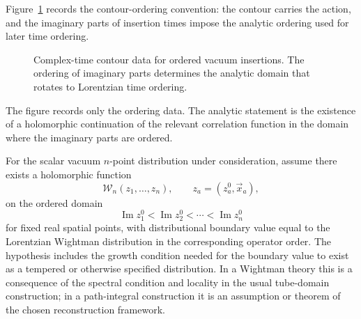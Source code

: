 Figure~\ref{fig:complex-time-contour-ordering} records the contour-ordering
convention: the contour carries the action, and the imaginary parts of
insertion times impose the analytic ordering used for later time ordering.

\begin{figure}[H]
\centering
{}
\caption{Complex-time contour data for ordered vacuum insertions.  The
ordering of imaginary parts determines the analytic domain that rotates to
Lorentzian time ordering.}
\label{fig:complex-time-contour-ordering}
\end{figure}

The figure records only the ordering data. The analytic statement is the
existence of a holomorphic continuation of the relevant correlation function
in the domain where the imaginary parts are ordered.

\begin{hypothesis}
\label{hyp:ordered-tube-analyticity-scalar}
For the scalar vacuum \(n\)-point distribution under consideration, assume
there exists a holomorphic function
\[
  \mathcal W_n(z_1,\ldots,z_n),
  \qquad z_a=(z_a^0,\vec x_a),
\]
on the ordered domain
\[
  \operatorname{Im}z_1^0
  <
  \operatorname{Im}z_2^0
  <
  \cdots
  <
  \operatorname{Im}z_n^0
\]
for fixed real spatial points, with distributional boundary value equal to
the Lorentzian Wightman distribution in the corresponding operator order.
The hypothesis includes the growth condition needed for the boundary value to
exist as a tempered or otherwise specified distribution.  In a Wightman theory
this is a consequence of the spectral condition and locality in the usual
tube-domain construction; in a path-integral construction it is an assumption
or theorem of the chosen reconstruction framework.
\end{hypothesis}

